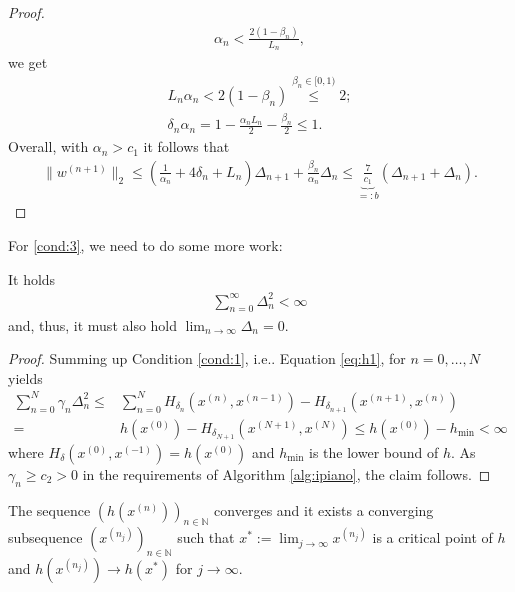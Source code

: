 \documentclass[onecolumn,final,a4paper,13pt,reqno]{siamart}
\makeatletter
\DeclareRobustCommand\onedot{\futurelet\@let@token\@onedot}
\def\@onedot{\ifx\@let@token.\else.\null\fi\xspace}
\def\ie{{i.e}\onedot} \def\Ie{{I.e}\onedot}
\makeatother
\begin{document}
\begin{proof}
	\begin{align}
		\alpha_n < \frac{2(1 - \beta_n)}{L_n},
	\end{align}
	we get
	\begin{align}
		L_n\alpha_n < 2(1 - \beta_n) \overset{\beta_n \in [0,1)}{\leq} 2;\\
		\delta_n \alpha_n = 1 - \frac{\alpha_n L_n}{2} - \frac{\beta_n}{2} \leq 1.
	\end{align}
	Overall, with $\alpha_n > c_1$ it follows that
	\begin{align}
		\|w^{(n + 1)}\|_2 \leq \left(\frac{1}{\alpha_n} + 4\delta_n + L_n\right)\Delta_{n + 1} + \frac{\beta_n}{\alpha_n}\Delta_n \leq \underbrace{\frac{7}{c_1}}_{=: b} (\Delta_{n + 1} + \Delta_n).
	\end{align}
\end{proof}

For \ref{cond:3}, we need to do some more work:

\begin{lemmamd}
	It holds
	\begin{align}
		\sum_{n = 0}^\infty \Delta_n^2 < \infty
	\end{align}
	and, thus, it must also hold $\lim_{n \rightarrow \infty} \Delta_n = 0$.\label{lemma:delta}
\end{lemmamd}

\begin{proof}
	Summing up Condition \ref{cond:1}, \ie Equation \eqref{eq:h1}, for $n = 0,\ldots,N$ yields
	\begin{align}
		\sum_{n = 0}^N \gamma_n \Delta_n^2 \leq& \sum_{n = 0}^N H_{\delta_n}(x^{(n)}, x^{(n - 1)}) - H_{\delta_{n + 1}}(x^{(n + 1)}, x^{(n)})\\
		=& h(x^{(0)}) - H_{\delta_{N + 1}}(x^{(N + 1)}, x^{(N)}) \leq h(x^{(0)}) - h_{\min} < \infty
	\end{align}
	where $H_\delta(x^{(0)}, x^{(-1)}) = h(x^{(0)})$ and $h_{\min}$ is the lower bound of $h$. As $\gamma_n \geq c_2 > 0$ in the requirements of Algorithm \ref{alg:ipiano}, the claim follows.
\end{proof}

\begin{lemmamd}
	The sequence $(h(x^{(n)}))_{n \in \mathbb{N}}$ converges and it exists a converging subsequence $(x^{(n_j)})_{n \in \mathbb{N}}$ such that $x^\ast := \lim_{j \rightarrow \infty} x^{(n_j)}$ is a critical point of $h$ and $h(x^{(n_j)}) \rightarrow h(x^\ast)$ for $j \rightarrow \infty$.\label{lemma:convergence}
\end{lemmamd}
\end{document}
